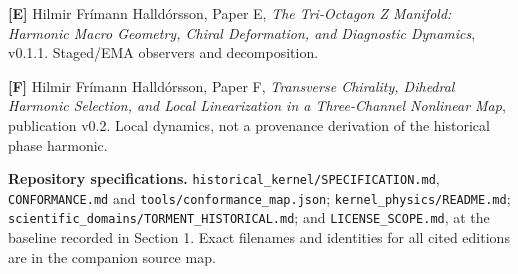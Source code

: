 \documentclass[
  11pt,
  a4paper,
]{article}
\begin{document}
\textbf{{[}E{]}} Hilmir Frímann Halldórsson, Paper E, \emph{The Tri-Octagon Z Manifold: Harmonic Macro Geometry, Chiral Deformation, and Diagnostic Dynamics}, v0.1.1. Staged/EMA observers and decomposition.

\textbf{{[}F{]}} Hilmir Frímann Halldórsson, Paper F, \emph{Transverse Chirality, Dihedral Harmonic Selection, and Local Linearization in a Three-Channel Nonlinear Map}, publication v0.2. Local dynamics, not a provenance derivation of the historical phase harmonic.

\textbf{Repository specifications.} \nolinkurl{historical_kernel/SPECIFICATION.md}, \texttt{CONFORMANCE.md} and \nolinkurl{tools/conformance_map.json}; \nolinkurl{kernel_physics/README.md}; \nolinkurl{scientific_domains/TORMENT_HISTORICAL.md}; and \texttt{LICENSE\_SCOPE.md}, at the baseline recorded in Section 1. Exact filenames and identities for all cited editions are in the companion source map.
\end{document}
